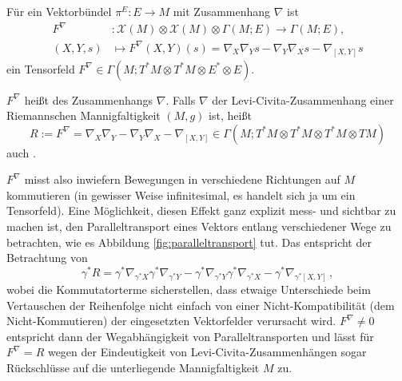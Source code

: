 \documentclass[../H_Analysis_main.tex]{subfiles}
\begin{document}
\begin{satz}
Für ein Vektorbündel $\pi^E: E \rightarrow M$ mit Zusammenhang $\nabla$ ist
\begin{equation}
\begin{split}
F^\nabla&: \mathcal{X}(M) \otimes \mathcal{X}(M) \otimes \Gamma(M; E) \rightarrow \Gamma(M; E),
\\
(X, Y, s) &\mapsto F^\nabla(X, Y)(s) = \nabla_X \nabla_Y s - \nabla_Y \nabla_X s - \nabla_{[X, Y]} s
\end{split}
\end{equation}
ein Tensorfeld $F^\nabla \in \Gamma(M; T^* M \otimes T^* M \otimes E^* \otimes E)$.
\end{satz}

\begin{defi}
$F^\nabla$ heißt  des Zusammenhangs $\nabla$. Falls $\nabla$ der Levi-Civita-Zusammenhang einer Riemannschen Mannigfaltigkeit $(M, g)$ ist, heißt
\begin{equation}
R := F^\nabla = \nabla_X \nabla_Y - \nabla_Y \nabla_X - \nabla_{[X, Y]} \in \Gamma(M; T^* M \otimes T^* M \otimes T^* M \otimes TM)
\end{equation}
auch .
\end{defi}

$F^\nabla$ misst also inwiefern Bewegungen in verschiedene Richtungen auf $M$ kommutieren (in gewisser Weise infinitesimal, es handelt sich ja um ein Tensorfeld). Eine Möglichkeit, diesen Effekt ganz explizit mess- und sichtbar zu machen ist, den Paralleltransport eines Vektors entlang verschiedener Wege zu betrachten, wie es Abbildung \ref{fig:paralleltransport} tut. Das entspricht der Betrachtung von
\begin{equation*}
\gamma^* R = \gamma^* \nabla_{\gamma^* X} \gamma^* \nabla_{\gamma^* Y} - \gamma^* \nabla_{\gamma^* Y} \gamma^* \nabla_{\gamma^* X} - \gamma^* \nabla_{\gamma^* [X, Y]} \, ,
\end{equation*}
wobei die Kommutatorterme sicherstellen, dass etwaige Unterschiede beim Vertauschen der Reihenfolge nicht einfach von einer Nicht-Kompatibilität (dem Nicht-Kommutieren) der eingesetzten Vektorfelder verursacht wird. $F^\nabla \neq 0$ entspricht dann der Wegabhängigkeit von Paralleltransporten und lässt für $F^\nabla = R$ wegen der Eindeutigkeit von Levi-Civita-Zusammenhängen sogar Rückschlüsse auf die unterliegende Mannigfaltigkeit $M$ zu.
\end{document}
